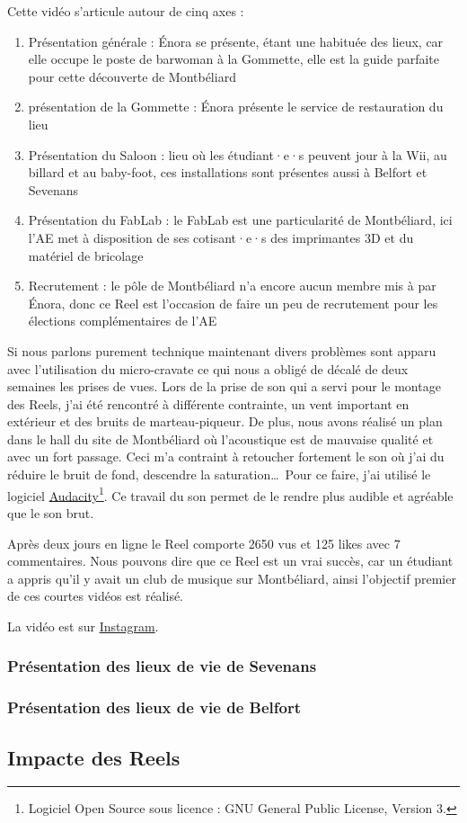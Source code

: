 Cette vidéo s'articule autour de cinq axes :
\begin{enumerate}
    \item Présentation générale : Énora se présente, étant une habituée des lieux, car elle occupe le poste de barwoman à la Gommette, elle est la guide parfaite pour cette découverte de Montbéliard
    \item présentation de la Gommette : Énora présente le service de restauration du lieu
    \item Présentation du Saloon : lieu où les étudiant·e·s peuvent jour à la Wii, au billard et au baby-foot, ces installations sont présentes aussi à Belfort et Sevenans
    \item Présentation du FabLab : le FabLab est une particularité de Montbéliard, ici l'\gls{AE} met à disposition de ses cotisant·e·s des imprimantes 3D et du matériel de bricolage
    \item Recrutement : le pôle de Montbéliard n'a encore aucun membre mis à par Énora, donc ce Reel est l'occasion de faire un peu de recrutement pour les élections complémentaires de l'\gls{AE}
\end{enumerate}


Si nous parlons purement technique maintenant divers problèmes sont apparu avec l'utilisation du micro-cravate ce qui nous a obligé de décalé de deux semaines les prises de vues.
Lors de la prise de son qui a servi pour le montage des Reels, j'ai été rencontré à différente contrainte, un vent important en extérieur et des bruits de marteau-piqueur.
De plus, nous avons réalisé un plan dans le hall du site de Montbéliard où l'acoustique est de mauvaise qualité et avec un fort passage.
Ceci m'a contraint à retoucher fortement le son où j'ai du réduire le bruit de fond, descendre la saturation\ldots\
Pour ce faire, j'ai utilisé le logiciel \href{https://www.audacityteam.org}{Audacity}\footnote{Logiciel Open Source sous licence : GNU General Public License, Version 3.}.
Ce travail du son permet de le rendre plus audible et agréable que le son brut.

Après deux jours en ligne le Reel comporte 2650 vus et 125 likes avec 7 commentaires.
Nous pouvons dire que ce Reel est un vrai succès, car un étudiant a appris qu'il y avait un club de musique sur Montbéliard, ainsi l'objectif premier de ces courtes vidéos est réalisé.

La vidéo est sur \href{https://www.instagram.com/reel/CyEDJKTspWL/?utm_source=ig_web_copy_link&igshid=MzRlODBiNWFlZA==}{Instagram}.



\subsubsection{Présentation des lieux de vie de Sevenans}

\subsubsection{Présentation des lieux de vie de Belfort}

\subsection{Impacte des Reels}\label{subsec:impacte-des-reels}